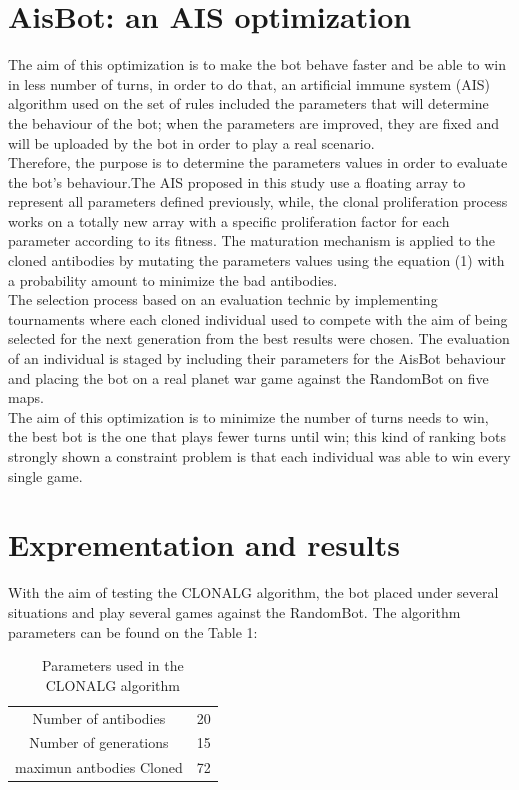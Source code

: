 \documentclass[conference]{IEEEtran}
\begin{document}
\section{AisBot: an AIS optimization}
The aim of this optimization is to make the bot behave faster and be able to win in less number of turns, in order to do that, an artificial immune system (AIS) algorithm used on the set of rules included the parameters that will determine the behaviour of the bot; when the parameters are improved, they are fixed and will be uploaded by the bot in order to play a real scenario. \\
Therefore, the purpose is to determine the parameters values in order to evaluate the bot's behaviour.The AIS proposed in this study use a floating array to represent all parameters defined previously, while, the clonal proliferation process works on a totally new array with a specific proliferation factor for each parameter according to its fitness. The maturation mechanism is applied to the cloned antibodies by mutating the parameters values using the equation (1) with a probability amount to minimize the bad antibodies. \\

The selection process based on an evaluation technic by implementing tournaments where each cloned individual used to compete with the aim of being selected for the next generation from the best results were chosen. The evaluation of an individual is staged by including their parameters for the AisBot behaviour and placing the bot on a real planet war game against the RandomBot on five maps. \\

The aim of this optimization is to minimize the number of turns needs to win, the best bot is the one that plays fewer turns until win; this kind of ranking bots strongly shown a constraint problem is that each individual was able to win every single game.

\section{Exprementation and results}
With the aim of testing the CLONALG algorithm, the bot placed under several situations and play several games against the RandomBot. The algorithm parameters can be found on the Table 1:
\begin{table}[h!]
\centering
\begin{tabular}{ |c|c| }
\hline
 Number of antibodies & 20 \\ 
 Number of generations & 15 \\  
 maximun antbodies Cloned & 72 \\ 
 \hline   
\end{tabular}
\caption{Parameters used in the CLONALG algorithm}
\label{TABLE 1}
\end{table}
\end{document}
